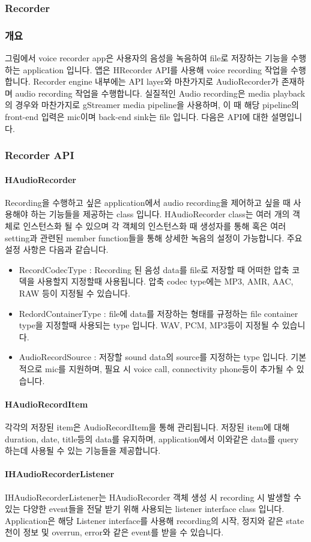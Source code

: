 \subsubsection{Recorder}
\subsubsection*{개요}
그림에서 voice recorder app은 사용자의 음성을 녹음하여 file로 저장하는 기능을 수행하는 application 입니다. 앱은 HRecorder API를 사용해 voice recording 작업을 수행합니다. Recorder engine 내부에는 API layer와 마찬가지로 AudioRecorder가 존재하며 audio recording 작업을 수행합니다. 실질적인 Audio recording은 media playback의 경우와 마찬가지로 gStreamer media
pipeline을 사용하며, 이 때 해당 pipeline의 front-end 입력은 mic이며 back-end sink는 file 입니다. 다음은 API에 대한 설명입니다.

\subsubsection*{Recorder API}
\paragraph{HAudioRecorder}
Recording을 수행하고 싶은 application에서 audio recording을 제어하고 싶을 때 사용해야 하는 기능들을 제공하는 class 입니다. HAudioRecorder class는 여러 개의 객체로 인스턴스화 될 수 있으며 각 객체의 인스턴스화 때 생성자를 통해 혹은 여러 setting과 관련된 member function들을 통해 상세한 녹음의 설정이 가능합니다. 주요 설정 사항은 다음과 같습니다.
\begin{itemize}
	\item RecordCodecType : Recording 된 음성 data를 file로 저장할 때 어떠한 압축 코덱을 사용할지 지정할때 사용됩니다. 압축 codec type에는 MP3, AMR, AAC, RAW 등이 지정될 수 있습니다.
	\item RedordContainerType : file에 data를 저장하는 형태를 규정하는 file container type을 지정할때 사용되는 type 입니다. WAV, PCM, MP3등이 지정될 수 있습니다.
	\item AudioRecordSource : 저장할 sound data의 source를 지정하는 type 입니다. 기본적으로 mic를 지원하며, 필요 시 voice call, connectivity phone등이 추가될 수 있습니다.
\end{itemize}
\paragraph{HAudioRecordItem}
각각의 저장된 item은 AudioRecordItem을 통해 관리됩니다. 저장된 item에 대해 duration, date, title등의 data를 유지하며, application에서 이와같은 data를 query 하는데 사용될 수 있는
기능들을 제공합니다.
\paragraph{IHAudioRecorderListener}
IHAudioRecorderListener는 HAudioRecorder 객체 생성 시 recording 시 발생할 수 있는 다양한 event들을 전달 받기 위해 사용되는 listener interface class 입니다. Application은 해당 Listener interface를 사용해 recording의 시작, 정지와 같은 state 천이 정보 및 overrun, error와 같은 event를 받을 수 있습니다.